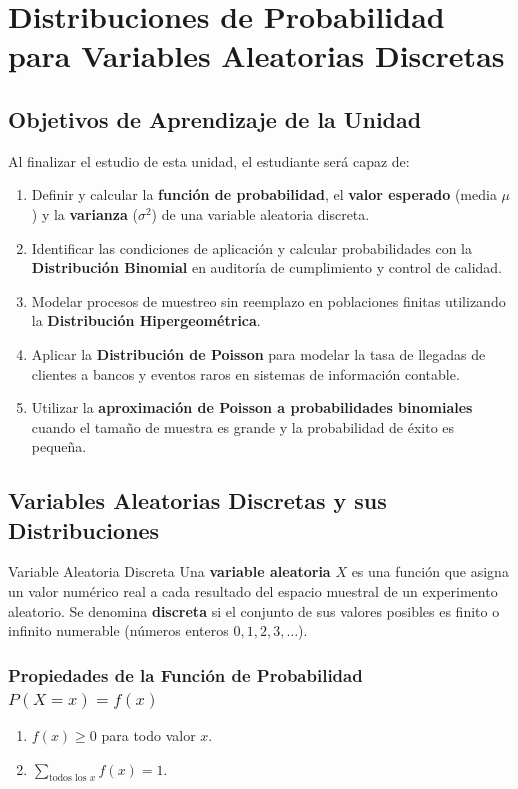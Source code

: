 \chapter{Distribuciones de Probabilidad para Variables Aleatorias Discretas}
\label{cap:distribuciones_discretas}

\section*{Objetivos de Aprendizaje de la Unidad}
Al finalizar el estudio de esta unidad, el estudiante será capaz de:
\begin{enumerate}
    \item Definir y calcular la \textbf{función de probabilidad}, el \textbf{valor esperado} (media $\mu$) y la \textbf{varianza} ($\sigma^2$) de una variable aleatoria discreta.
    \item Identificar las condiciones de aplicación y calcular probabilidades con la \textbf{Distribución Binomial} en auditoría de cumplimiento y control de calidad.
    \item Modelar procesos de muestreo sin reemplazo en poblaciones finitas utilizando la \textbf{Distribución Hipergeométrica}.
    \item Aplicar la \textbf{Distribución de Poisson} para modelar la tasa de llegadas de clientes a bancos y eventos raros en sistemas de información contable.
    \item Utilizar la \textbf{aproximación de Poisson a probabilidades binomiales} cuando el tamaño de muestra es grande y la probabilidad de éxito es pequeña.
\end{enumerate}

\section{Variables Aleatorias Discretas y sus Distribuciones}

\begin{definicion}{Variable Aleatoria Discreta}
Una \textbf{variable aleatoria} $X$ es una función que asigna un valor numérico real a cada resultado del espacio muestral de un experimento aleatorio. Se denomina \textbf{discreta} si el conjunto de sus valores posibles es finito o infinito numerable (números enteros $0, 1, 2, 3, \dots$).
\end{definicion}

\subsection{Propiedades de la Función de Probabilidad $P(X=x) = f(x)$}
\begin{enumerate}
    \item $f(x) \ge 0$ para todo valor $x$.
    \item $\sum_{\text{todos los } x} f(x) = 1$.
\end{enumerate}

